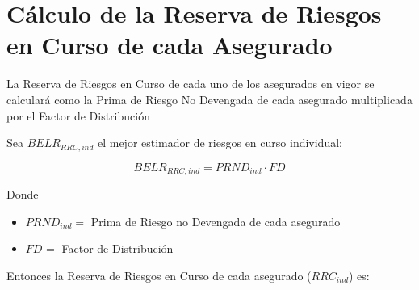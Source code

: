 \documentclass[11pt,twoside,openright,spanish]{report}
\numberwithin{equation}{chapter}
\numberwithin{figure}{chapter}
\numberwithin{table}{chapter}
\begin{document}
$ $

 
	
	\section{Cálculo de la Reserva de Riesgos en Curso de cada Asegurado}
	
	 
	
	La Reserva de Riesgos en Curso de cada uno de los asegurados en vigor se calculará como la Prima de Riesgo No Devengada de cada asegurado multiplicada por el Factor de Distribución \begin{comment} y sumando el $BELG_{ADM,ind}$ así como el Margen de Riesgo prorrateado.
	\end{comment}
	 
	
	Sea $BELR_{RRC,ind}$ el mejor estimador de riesgos en curso individual:
	


	\begin{comment}	
		$
		BELR_{RRC,ind}=\begin{cases}
		PRND_{ind}\cdot FD_{}, & \text{$g \neq Salud Dental Individual$}\\
	
		PTND_{ind}\cdot FS_{BEL}^{RRC}, & \text{$g = Salud Dental Individual$}
		\end{cases}
		$
\end{comment}	

\begin{equation}
	BELR_{RRC,ind}=PRND_{ind}\cdot FD_{}
	\label{eq19}
\end{equation}

 
	
	Donde
	
		
	\begin{itemize}
	\setlength\itemsep{-0.5em}	
	\item $PRND_{ind}=$ Prima de Riesgo no Devengada de cada asegurado
	
	\item $FD_{}^{}=$ Factor de Distribución
	\end{itemize}
	
		\begin{comment}
	$PTND_{ind}=$ Prima de Tarifa no Devengada de cada asegurado
	

	$FS_{BEL}^{RRC}=$ Factor de Siniestralidad última con información de mercado
	\end{comment}
	
	 
	Entonces la Reserva de Riesgos en Curso de cada asegurado ($RRC_{ind}$) es:
	
\end{document}

